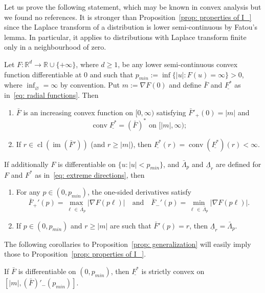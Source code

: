 \documentclass[10pt]{amsart}
\theoremstyle{definition}\newtheorem{defi}[theo]{Definition}\newtheorem{rema}[theo]{Remark}\newtheorem{exam}[theo]{Example}\newtheorem{exem}[theo]{Example}\newtheorem{nota}[theo]{Notation}
\DeclareMathOperator{\conv}{conv}
\DeclareMathOperator{\im}{im}
\DeclareMathOperator{\cl}{cl}
\newcommand{\ubar}[1]{\underline{#1}}
\newcommand{\Rbb}{\mathbb{R}}
\newcommand*{\alphenumi}{\renewcommand*{\theenumi}{\alph{enumi}}}
\begin{document}
Let us prove the following statement, which may be known in convex analysis but we found no references. It is stronger than Proposition~\ref{prop: properties of I_} since the Laplace transform of a distribution is lower semi-continuous by Fatou's lemma. In particular, it applies to distributions with Laplace transform finite only in a neighbourhood of zero.

\begin{prop}\label{prop: generalization}
Let $F: \Rbb^d \to \Rbb \cup \{+ \infty \}$, where $d \ge 1$, be any lower semi-continuous convex function differentiable at $0$ and such that $p_{min}:= \inf\{|u|: F(u)=\infty \}>0$, where $\inf_\varnothing=\infty$ by convention. Put $m:= \nabla F(0)$ and define $\bar F$ and $\ubar{F^*}$ as in~\eqref{eq: radial functions}. Then
\begin{enumerate}\alphenumi
\item \label{item': conv I_ =}
$\bar F$ is an increasing convex function on $[0, \infty)$ satisfying $\bar F'_+(0)=|m|$ and
\[
\conv \ubar {F^*} = (\bar{F})^* \text{ on }[|m|, \infty);
\]
\item \label{item': I_=conv I_}
If $r \in \cl (\im(\bar{F}'))$ (and $r \ge |m|$), then $\ubar {F^*}(r) = \conv (\ubar {F^*})(r)<\infty$.
\end{enumerate}

If additionally $F$ is differentiable on $\{u: |u|<p_{min}\}$, and $\bar{\Lambda}_p$ and $\ubar{\Lambda}_r$ are defined for $F$ and $F^*$ as in~\eqref{eq: extreme directions}, then
\begin{enumerate}\alphenumi
\setcounter{enumi}{2}
\item \label{item': differentiable}
For any $p \in (0,p_{min})$, the one-sided derivatives satisfy
\[
\bar F_+'(p) = \max_{\ell\,\in\,\bar{\Lambda}_p}\left|\nabla F(p \ell)\right| \quad \text{and} \quad \bar F_-'(p) = \min_{\ell\,\in\,\bar{\Lambda}_p }\left|\nabla F (p \ell)\right|.
\]
\item \label{item': Lambdas}
If $p \in (0,p_{min})$ and $r \ge |m|$ are such that $\bar{F}'(p)=r$, then $\ubar{\Lambda}_r = \bar{\Lambda}_p$.
\end{enumerate}
\end{prop}

The following corollaries to Proposition~\ref{prop: generalization} will easily imply those to Proposition~\ref{prop: properties of I_}.

\begin{coro} \label{cor': L differentiable}
If $\bar F$ is differentiable on $(0, p_{min})$, then $\ubar {F^*}$ is strictly convex on $[|m|, (\bar F)'_-(p_{min})]$.
\end{coro}
\end{document}
